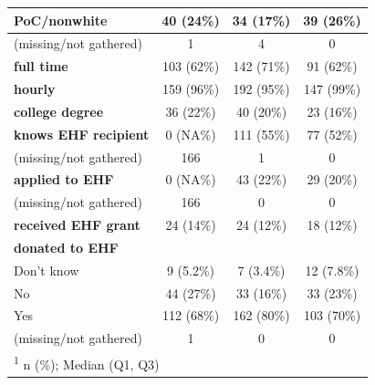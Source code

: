 \documentclass[
  11pt,
  oneside]{article}
\begin{document}
\begin{table}
\begin{tabular}[t]{l|c|c|c}
\hline
\textbf{PoC/nonwhite} & 40 (24\%) & 34 (17\%) & 39 (26\%)\\
\hline
\hspace{1em}(missing/not gathered) & 1 & 4 & 0\\
\hline
\textbf{full time} & 103 (62\%) & 142 (71\%) & 91 (62\%)\\
\hline
\textbf{hourly} & 159 (96\%) & 192 (95\%) & 147 (99\%)\\
\hline
\textbf{college degree} & 36 (22\%) & 40 (20\%) & 23 (16\%)\\
\hline
\textbf{knows EHF recipient} & 0 (NA\%) & 111 (55\%) & 77 (52\%)\\
\hline
\hspace{1em}(missing/not gathered) & 166 & 1 & 0\\
\hline
\textbf{applied to EHF} & 0 (NA\%) & 43 (22\%) & 29 (20\%)\\
\hline
\hspace{1em}(missing/not gathered) & 166 & 0 & 0\\
\hline
\textbf{received EHF grant} & 24 (14\%) & 24 (12\%) & 18 (12\%)\\
\hline
\textbf{donated to EHF} &  &  & \\
\hline
\hspace{1em}Don’t know & 9 (5.2\%) & 7 (3.4\%) & 12 (7.8\%)\\
\hline
\hspace{1em}No & 44 (27\%) & 33 (16\%) & 33 (23\%)\\
\hline
\hspace{1em}Yes & 112 (68\%) & 162 (80\%) & 103 (70\%)\\
\hline
\hspace{1em}(missing/not gathered) & 1 & 0 & 0\\
\hline
\multicolumn{4}{l}{\rule{0pt}{1em}\textsuperscript{1} n (\%); Median (Q1, Q3)}\\
\end{tabular}
\end{table}
\end{document}
